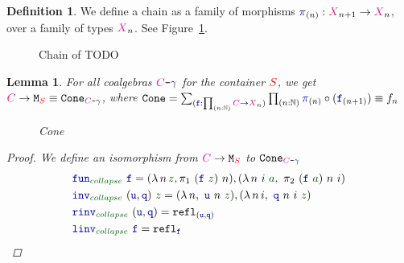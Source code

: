 \documentclass[twoside,11pt,openright]{report}
\theoremstyle{plain} %
\newtheorem{lem}[thm]{Lemma}
\theoremstyle{definition}
\newtheorem{defn}{Definition}[section]
\theoremstyle{remark}
\newcommand*{\figref}[1]{Figure~\ref{fig:#1}}
\newcommand*{\term}[1]{\textcolor{green!30!black}{#1}} %
\newcommand*{\pathterm}[1]{\textcolor{green!40!black}{#1}}
\newcommand*{\type}[1]{\textcolor{magenta!90!black}{#1}}
\newcommand*{\container}[1]{\textcolor{red}{#1}}
\newcommand*{\coalg}[2]{#1\texttt{-}#2}
\newcommand*{\function}[1]{\textcolor{blue!60!black}{\ensuremath{\mathtt{#1}}}}
\newcommand*{\typeformer}[1]{\ensuremath{\mathtt{#1}}}
\begin{document}
\begin{defn}
  We define a chain as a family of morphisms \(\function{\pi}_{(n)} : \type{X}_{n+1} \rightarrow \type{X}_{n}\), over a family of types \(\type{X}_{n}\). See \figref{x-chain}.
  \begin{figure}
    \label{fig:x-chain}
    \centering
    \caption{Chain of TODO}
  \end{figure}  
\end{defn}
\begin{lem}\label{lem:function-to-M-type-is-cone}
  For all coalgebras \(\coalg{\type{C}}{\function{\gamma}}\) for the container \(\container{S}\), we get \(\type{C} \rightarrow \typeformer{M}_{\container{S}} \equiv \typeformer{Cone}_{\coalg{\type{C}}{\function{\gamma}}}\), where \(\typeformer{Cone} = \sum_{(\function{f} : \prod_{(n : \mathbb{N})} \type{C} \rightarrow \type{X}_n)} \prod_{(n : \mathbb{N})} \function{\pi}_{(n)} \circ (\function{f}_{(n+1)}) \equiv f_n\)
  \begin{figure}
    \centering
    \caption{Cone}
  \end{figure}  
  \begin{proof}
    We define an isomorphism from \(\type{C} \rightarrow \typeformer{M}_{\container{S}}\) to \(\typeformer{Cone}_{\coalg{\type{C}}{\function{\gamma}}}\)
    \begin{align}
      &\function{fun}_{\pathterm{collapse}}~\function{f} = (\lambda\,n\,\term{z},\pi_1~(\function{f}~\term{z})~n),(\lambda\,n~i~\term{a},~\pi_2~(\function{f}~\term{a})~n~i) \\
      &\function{inv}_{\pathterm{collapse}}~(\function{u},\function{q})~\term{z} = (\lambda\,n,~\function{u}~n~\term{z}),(\lambda\,n\,i,~\function{q}~n~i~\term{z}) \\
      &\function{rinv}_{\pathterm{collapse}}~(\function{u},\function{q}) = \mathtt{refl}_{(\function{u},\function{q})} \\
      &\function{linv}_{\pathterm{collapse}}~\function{f} = \mathtt{refl}_{\function{f}}
    \end{align}
  \end{proof}
\end{lem}
\end{document}
